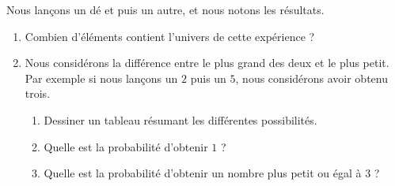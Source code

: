 
\begin{exercice}\label{exosmath-0357}

    Nous lançons un dé et puis un autre, et nous notons les résultats.
    \begin{enumerate}
        \item
            Combien d'éléments contient l'univers de cette expérience ?
        \item
            Nous considérons la différence entre le plus grand des deux et le plus petit. Par exemple si nous lançons un \( 2\) puis un \( 5\), nous considérons avoir obtenu trois. 
            
            \begin{enumerate}
                \item 
            Dessiner un tableau résumant les différentes possibilités.
                \item
                   Quelle est la probabilité d'obtenir \( 1\) ?
                \item
                    Quelle est la probabilité d'obtenir un nombre plus petit ou égal à \( 3\) ?
            \end{enumerate}
    \end{enumerate}

\end{exercice}
